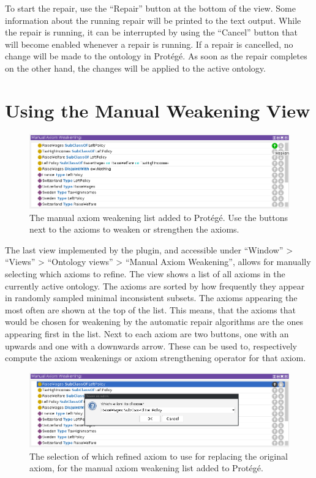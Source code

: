 To start the repair, use the ``Repair'' button at the bottom of the view. Some information about the running repair will be printed to the text output. While the repair is running, it can be interrupted by using the ``Cancel'' button that will become enabled whenever a repair is running. If a repair is cancelled, no change will be made to the ontology in Protégé. As soon as the repair completes on the other hand, the changes will be applied to the active ontology.

\section{Using the Manual Weakening View}

\begin{figure}[htbp]
  \centering
  \includegraphics[width=\textwidth]{resources/protege-guide-list.png}
  \caption{The manual axiom weakening list added to Protégé. Use the buttons next to the axioms to weaken or strengthen the axioms.}
\end{figure}

The last view implemented by the plugin, and accessible under ``Window'' > ``Views'' > ``Ontology views'' > ``Manual Axiom Weakening'', allows for manually selecting which axioms to refine. The view shows a list of all axioms in the currently active ontology. The axioms are sorted by how frequently they appear in randomly sampled minimal inconsistent subsets. The axioms appearing the most often are shown at the top of the list. This means, that the axioms that would be chosen for weakening by the automatic repair algorithms are the ones appearing first in the list. Next to each axiom are two buttons, one with an upwards and one with a downwards arrow. These can be used to, respectively  compute the axiom weakenings or axiom strengthening operator for that axiom.

\begin{figure}[htbp]
  \centering
  \includegraphics[width=\textwidth]{resources/protege-guide-replace.png}
  \caption{The selection of which refined axiom to use for replacing the original axiom, for the manual axiom weakening list added to Protégé.}
\end{figure}

